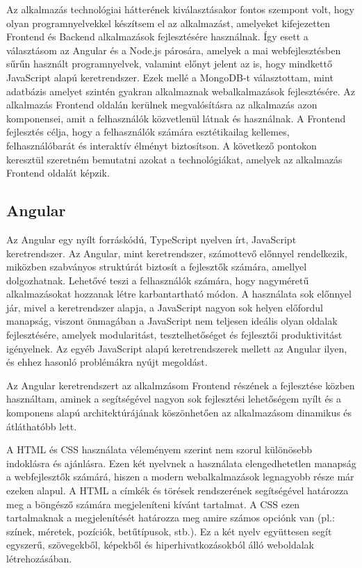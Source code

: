 Az alkalmazás technológiai hátterének kiválasztásakor fontos szempont volt, hogy olyan programnyelvekkel készítsem el az alkalmazást, amelyeket kifejezetten Frontend és Backend alkalmazások fejlesztésére használnak. Így esett a választásom az Angular és a Node.js párosára, amelyek a mai webfejlesztésben sűrűn használt programnyelvek, valamint előnyt jelent az is, hogy mindkettő JavaScript alapú keretrendszer. Ezek  mellé a MongoDB-t választottam, mint adatbázis amelyet szintén gyakran alkalmaznak webalkalmazások fejlesztésére. 
Az alkalmazás Frontend oldalán kerülnek megvalósításra az alkalmazás azon komponensei, amit a felhasználók közvetlenül látnak és használnak. A Frontend fejlesztés célja, hogy a felhasználók számára esztétikailag kellemes, felhasználóbarát és interaktív élményt biztosítson. A következő pontokon keresztül szeretném bemutatni azokat a technológiákat, amelyek az alkalmazás Frontend oldalát képzik.
\subsection{Angular}
Az Angular \cite{Angular1} egy nyílt forráskódú, TypeScript \cite{TypeScript} nyelven írt, JavaScript keretrendszer. Az Angular, mint keretrendszer, számottevő előnnyel rendelkezik, miközben szabványos struktúrát biztosít a fejlesztők számára, amellyel dolgozhatnak. Lehetővé teszi a felhasználók számára, hogy nagyméretű alkalmazásokat hozzanak létre karbantartható módon. A használata sok előnnyel jár, mivel a keretrendszer alapja, a JavaScript nagyon sok helyen előfordul manapság, viszont önmagában a JavaScript nem teljesen ideális olyan oldalak fejlesztésére, amelyek modularitást, tesztelhetőséget és fejlesztői produktivitást igényelnek. Az egyéb JavaScript alapú keretrendszerek mellett az Angular ilyen, és ehhez hasonló problémákra nyújt megoldást.

Az Angular keretrendszert az alkalmzásom Frontend részének a fejlesztése közben használtam, aminek a segítségével nagyon sok fejlesztési lehetőségem nyílt és a komponens alapú architektúrájának köszönhetően az alkalmazásom dinamikus és átláthatóbb lett.
\cite{Angular}

A HTML és CSS használata véleményem szerint nem szorul különösebb indoklásra és ajánlásra. Ezen két nyelvnek a használata elengedhetetlen manapság a webfejlesztők számárá, hiszen a modern webalkalmazások legnagyobb része már ezeken alapul. A HTML a címkék és törések rendszerének segítségével határozza meg a böngésző számára megjeleníteni kívánt tartalmat. A CSS ezen tartalmaknak a megjelenítését határozza meg amire számos opciónk van (pl.: színek, méretek, pozíciók, betűtípusok, stb.). Ez a két nyelv együttesen segít egyszerű, szövegekből, képekből és hiperhivatkozásokból álló weboldalak létrehozásában.
\cite{HTML}


